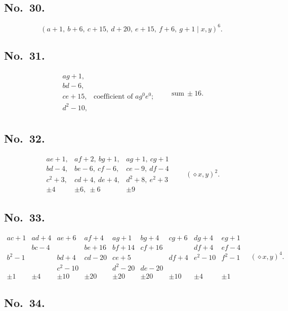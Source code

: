 \documentclass[11pt]{article}
\begin{document}
\subsection*{No.\ 30.}
\[
(a+1,\ b+6,\ c+15,\ d+20,\ e+15,\ f+6,\ g+1 \mid x, y)^6.
\]

\subsection*{No.\ 31.}
\[
\begin{array}{ll}
ag + 1, & \\
bd - 6, &\\
ce + 15, & \mbox{coefficient of } a g^0 e^0; \\
d^2 - 10, & \\
\end{array}
\qquad \text{sum}\ \pm 16.
\]

\subsection*{No.\ 32.}
\[
\begin{array}{|c|c|c|}\hline
ae + 1, & af + 2,\ bg + 1, & ag + 1,\ cg + 1 \\
bd - 4, & be - 6,\ cf - 6, & ce - 9,\ df - 4 \\
c^2 + 3, & cd + 4,\ de + 4, & d^2 + 8,\ e^2 + 3 \\\hline
\pm 4 & \pm 6,\ \pm 6 & \pm 9
\end{array} \qquad (\diamond x,y)^2.
\]

\subsection*{No.\ 33.}
\[
\begin{array}{c|c|c|c|c|c|c|c|c}
ac + 1 & ad + 4 & ae + 6 & af + 4 & ag + 1 & bg + 4 & cg + 6 & dg + 4 & eg + 1 \\
       & bc - 4 &        & be + 16 & bf + 14 & cf + 16 & & df + 4 & ef - 4 \\
b^2 - 1 &        & bd + 4 & cd - 20 & ce + 5 &        & df + 4 & e^2 - 10 & f^2 - 1 \\
       &        & c^2 - 10 &       & d^2 - 20 & de - 20 & & & \\\hline
\pm 1 & \pm 4 & \pm 10 & \pm 20 & \pm 20 & \pm 20 & \pm 10 & \pm 4 & \pm 1
\end{array}
\quad (\diamond x,y)^4.
\]

\subsection*{No.\ 34.}
\end{document}
